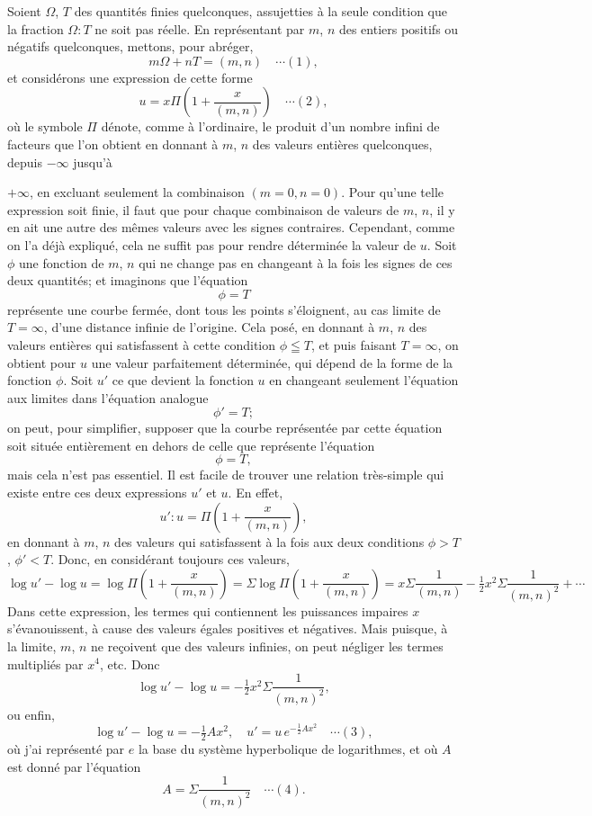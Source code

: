 \documentclass[12pt,a4paper]{article}
\begin{document}
Soient $\Omega$, $T$ des quantit\'es finies quelconques, assujetties \`a la seule condition que la fraction $\Omega : T$ ne soit pas r\'eelle. En repr\'esentant par $m$, $n$ des entiers positifs ou n\'egatifs quelconques, mettons, pour abr\'eger,
\[
m\Omega + nT = (m,n) \quad\cdots(1),
\]
et consid\'erons une expression de cette forme
\[
u = x\Pi\!\left(1 + \frac{x}{(m,n)}\right) \quad\cdots(2),
\]
o\`u le symbole $\Pi$ d\'enote, comme \`a l'ordinaire, le produit d'un nombre infini de facteurs que l'on obtient en donnant \`a $m$, $n$ des valeurs enti\`eres quelconques, depuis $-\infty$ jusqu'\`a

\newpage
\setcounter{page}{158}

$+\infty$, en excluant seulement la combinaison $(m=0, n=0)$. Pour qu'une telle expression soit finie, il faut que pour chaque combinaison de valeurs de $m$, $n$, il y en ait une autre des m\^emes valeurs avec les signes contraires. Cependant, comme on l'a d\'ej\`a expliqu\'e, cela ne suffit pas pour rendre d\'etermin\'ee la valeur de $u$. Soit $\phi$ une fonction de $m$, $n$ qui ne change pas en changeant \`a la fois les signes de ces deux quantit\'es; et imaginons que l'\'equation
\[
\phi = T
\]
repr\'esente une courbe ferm\'ee, dont tous les points s'\'eloignent, au cas limite de $T = \infty$, d'une distance infinie de l'origine. Cela pos\'e, en donnant \`a $m$, $n$ des valeurs enti\`eres qui satisfassent \`a cette condition $\phi \leqq T$, et puis faisant $T = \infty$, on obtient pour $u$ une valeur parfaitement d\'etermin\'ee, qui d\'epend de la forme de la fonction $\phi$. Soit $u'$ ce que devient la fonction $u$ en changeant seulement l'\'equation aux limites dans l'\'equation analogue
\[
\phi' = T;
\]
on peut, pour simplifier, supposer que la courbe repr\'esent\'ee par cette \'equation soit situ\'ee enti\`erement en dehors de celle que repr\'esente l'\'equation
\[
\phi = T,
\]
mais cela n'est pas essentiel. Il est facile de trouver une relation tr\`es-simple qui existe entre ces deux expressions $u'$ et $u$. En effet,
\[
u' : u = \Pi\!\left(1 + \frac{x}{(m,n)}\right),
\]
en donnant \`a $m$, $n$ des valeurs qui satisfassent \`a la fois aux deux conditions $\phi > T$, $\phi' < T$. Donc, en consid\'erant toujours ces valeurs,
\[
\log u' - \log u = \log\Pi\!\left(1 + \frac{x}{(m,n)}\right) = \Sigma\log\Pi\!\left(1 + \frac{x}{(m,n)}\right) = x\Sigma\frac{1}{(m,n)} - \tfrac{1}{2}x^2\Sigma\frac{1}{(m,n)^2} + \cdots
\]
Dans cette expression, les termes qui contiennent les puissances impaires $x$ s'\'evanouissent, \`a cause des valeurs \'egales positives et n\'egatives. Mais puisque, \`a la limite, $m$, $n$ ne re\c{c}oivent que des valeurs infinies, on peut n\'egliger les termes multipli\'es par $x^4$, etc. Donc
\[
\log u' - \log u = -\tfrac{1}{2}x^2 \Sigma\frac{1}{(m,n)^2},
\]
ou enfin,
\[
\log u' - \log u = -\tfrac{1}{2}Ax^2,\quad u' = u\,e^{-\frac12 Ax^2} \quad\cdots(3),
\]
o\`u j'ai repr\'esent\'e par $e$ la base du syst\`eme hyperbolique de logarithmes, et o\`u $A$ est donn\'e par l'\'equation
\[
A = \Sigma\frac{1}{(m,n)^2} \quad\cdots(4).
\]
\end{document}
